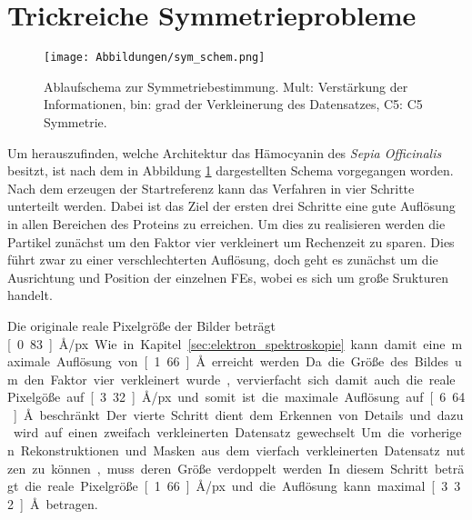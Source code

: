\section{Trickreiche Symmetrieprobleme} %
\label{sec:symmetrieproblem}

\begin{figure}
	\texttt{[image: Abbildungen/sym\_schem.png]}
	\caption[Ablaufschema zur Symmetriebestimmung]{Ablaufschema zur Symmetriebestimmung. Mult: Verstärkung der Informationen, bin: grad der Verkleinerung des Datensatzes, C5: C5 Symmetrie.}
	\label{symmi}
\end{figure}

Um herauszufinden, welche Architektur das Hämocyanin des \textit{Sepia Officinalis} besitzt, ist nach dem in Abbildung \ref{symmi} dargestellten Schema vorgegangen worden.
Nach dem erzeugen der Startreferenz kann das Verfahren in vier Schritte unterteilt werden.
Dabei ist das Ziel der ersten drei Schritte eine gute Auflösung in allen Bereichen des Proteins zu erreichen.
Um dies zu realisieren werden die Partikel zunächst um den Faktor vier verkleinert um Rechenzeit zu sparen.
Dies führt zwar zu einer verschlechterten Auflösung, doch geht es zunächst um die Ausrichtung und Position der einzelnen FEs, wobei es sich um große Srukturen handelt.

Die originale reale Pixelgröße der Bilder beträgt \unit[0.83]{\AA/px}.
Wie in Kapitel \ref{sec:elektron_spektroskopie} kann damit eine maximale Auflösung von \unit[1.66]{\AA} erreicht werden.
Da die Größe des Bildes um den Faktor vier verkleinert wurde, vervierfacht sich damit auch die reale Pixelgöße auf \unit[3.32]{\AA/px} und somit ist die maximale Auflösung auf \unit[6.64]{\AA} beschränkt.

Der vierte Schritt dient dem Erkennen von Details und dazu wird auf einen zweifach verkleinerten Datensatz gewechselt.
Um die vorherigen Rekonstruktionen und Masken aus dem vierfach verkleinerten Datensatz nutzen zu können, muss deren Größe verdoppelt werden.
In diesem Schritt beträgt die reale Pixelgröße \unit[1.66]{\AA/px} und die Auflösung kann maximal \unit[3.32]{\AA} betragen.

